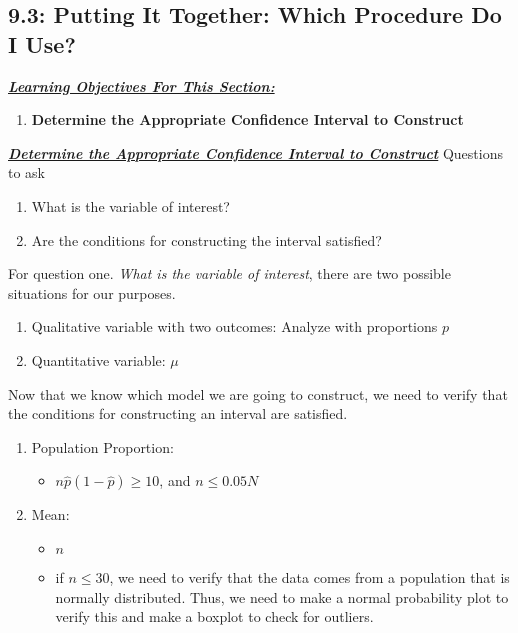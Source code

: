 \documentclass{report}
\begin{document}
    \subsection{9.3: Putting It Together: Which Procedure Do I Use?}
    \bigbreak \noindent 
    \textbf{\textit{\underline{Learning Objectives For This Section:}}}
    \begin{enumerate}
        \item \textbf{Determine the Appropriate Confidence Interval to Construct}
    \end{enumerate}
    \bigbreak \noindent \bigbreak \noindent 
    \textbf{\textit{\underline{Determine the Appropriate Confidence Interval to Construct}}}
    \bigbreak \noindent 
    Questions to ask
    \begin{enumerate}
        \item What is the variable of interest? 
        \item Are the conditions for constructing the interval satisfied?
    \end{enumerate}
    \bigbreak \noindent 
    For question one. \textit{What is the variable of interest}, there are two possible situations for our purposes.
    \begin{enumerate}
        \item Qualitative variable with two outcomes: Analyze with proportions $p$
        \item Quantitative variable: $\mu $
    \end{enumerate}
    \bigbreak \noindent 
    Now that we know which model we are going to construct, we need to verify that the conditions for constructing an interval are satisfied.
    \begin{enumerate}
        \item Population Proportion:
            \begin{itemize}
                \item $n\hat{p}(1-\hat{p}) \geq 10 $, and $n \leq 0.05N$
            \end{itemize}
        \item Mean:
            \begin{itemize}
                \item $n $
                \item if $n \leq 30 $, we need to verify that the data comes from a population that is normally distributed. Thus, we need to make a normal probability plot to verify this and make a boxplot to check for outliers.
            \end{itemize}
    \end{enumerate}
\end{document}
